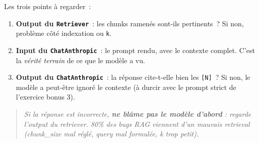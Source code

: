 \documentclass[11pt,a4paper]{article}
\begin{document}
\begin{center}
\end{center}

Les trois points à regarder~:
\begin{enumerate}[leftmargin=*]
  \item \textbf{Output du \texttt{Retriever}}~: les chunks ramenés
        sont-ils pertinents~? Si non, problème côté indexation ou
        \texttt{k}.
  \item \textbf{Input du \texttt{ChatAnthropic}}~: le prompt rendu, avec
        le contexte complet. C'est la \emph{vérité terrain} de ce que le
        modèle a vu.
  \item \textbf{Output du \texttt{ChatAnthropic}}~: la réponse cite-t-elle
        bien les \texttt{[N]}~? Si non, le modèle a peut-être ignoré le
        contexte (à durcir avec le prompt strict de l'exercice bonus 3).
\end{enumerate}

\begin{quote}\itshape
Si la réponse est incorrecte, \textbf{ne blâme pas le modèle d'abord} :
regarde l'output du retriever. 80\% des bugs RAG viennent d'un mauvais
retrieval (chunk\_size mal réglé, query mal formulée, k trop petit).
\end{quote}
\end{document}
